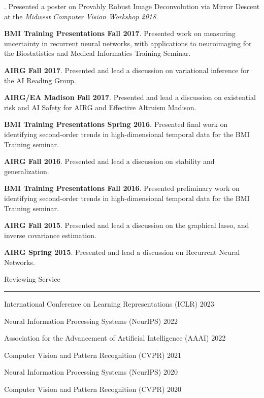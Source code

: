 \documentclass[]{article}
\begin{document}
. Presented a poster on Provably Robust Image Deconvolution via Mirror Descent at the \textit{Midwest Computer Vision Workshop 2018.}

\noindent \textbf{BMI Training Presentations Fall 2017}. Presented work on measuring uncertainty in recurrent neural networks, with applications to neuroimaging for the Biostatistics and Medical Informatics Training Seminar.

\noindent \textbf{AIRG Fall 2017}. Presented and lead a discussion on variational inference for the AI Reading Group.

\noindent \textbf{AIRG/EA Madison Fall 2017}. Presented and lead a discussion on existential risk and AI Safety for AIRG and Effective Altruism Madison.

\noindent \textbf{BMI Training Presentations Spring 2016}. Presented final work on identifying second-order trends in high-dimensional temporal data for the BMI Training seminar.

\noindent \textbf{AIRG Fall 2016}. Presented and lead a discussion on stability and generalization.

\noindent \textbf{BMI Training Presentations Fall 2016}. Presented preliminary work on identifying second-order trends in high-dimensional temporal data for the BMI Training seminar.

\noindent \textbf{AIRG Fall 2015}. Presented and lead a discussion on the graphical lasso, and inverse covariance estimation.

\noindent \textbf{AIRG Spring 2015}. Presented and lead a discussion on Recurrent Neural Networks.

\fi

\vspace{20pt}
{\LARGE Reviewing Service}
\vspace{3pt}
\hrule
\vspace{10pt}

\noindent International Conference on Learning Representations (ICLR) \hfill 2023

\noindent Neural Information Processing Systems (NeurIPS) \hfill 2022

\noindent Association for the Advancement of Artificial Intelligence (AAAI) \hfill 2022

\noindent Computer Vision and Pattern Recognition (CVPR) \hfill 2021

\noindent Neural Information Processing Systems (NeurIPS) \hfill 2020

\noindent Computer Vision and Pattern Recognition (CVPR) \hfill 2020
\end{document}
